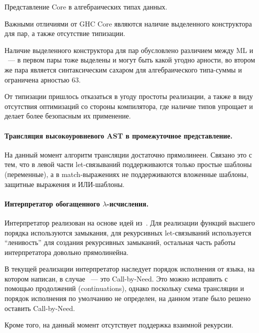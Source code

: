 \begin{listing}
    \inputminted[fontsize=\footnotesize]{haskell}{figures/core.hs}
    \caption{Представление Core в алгебраических типах данных.}
    \label{lst:core}
\end{listing}

Важными отличиями от GHC Core являются наличие выделенного конструктора для пар, а также отсутствие типизации.

Наличие выделенного конструктора для пар обусловлено различием между ML и \Haskell{}~--- в первом пары тоже выделены и могут быть какой угодно арности, во втором же пара является синтаксическим сахаром для алгебраического типа-суммы и ограничена арностью 63.

От типизации пришлось отказаться в угоду простоты реализации, а также в виду отсутствия оптимизаций со стороны компилятора, где наличие типов упрощает и делает более безопасным их применение.

\paragraph{Трансляция высокоуровневого AST в промежуточное представление.}

На данный момент алгоритм трансляции достаточно прямолинеен.
Связано это с тем, что в левой части let-связываний поддерживаются только простые шаблоны (переменные), а в match-выражениях не поддерживаются вложенные шаблоны, защитные выражения и ИЛИ-шаблоны.

\paragraph{Интерпретатор обогащенного $\lambda$-исчисления.}

Интерпретатор реализован на основе идей из~\cite{reynoldsDefinitionalInterpretersHigherorder1972}.
Для реализации функций высшего порядка используются замыкания, для рекурсивных let-связываний используется \enquote{ленивость} \Haskell{} для создания рекурсивных замыканий, остальная часть работы интерпретатора довольно прямолинейна.

В текущей реализации интерпретатор наследует порядок исполнения от языка, на котором написан, в случае \Haskell{}~--- это Call-by-Need.
Это можно исправить с помощью продолжений (continuations), однако поскольку схема трансляции и порядок исполнения \INs{} по умолчанию не определен, на данном этапе было решено оставить Call-by-Need.

Кроме того, на данный момент отсутствует поддержка взаимной рекурсии.

